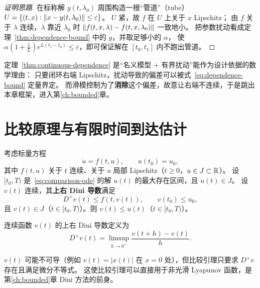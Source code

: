 \begin{proof}[证明思路]
  在标称解 $y(t,\lambda_0)$ 周围构造一根“管道”（tube）$U=\{(t,x):\left\lVert x-y(t,\lambda_0)\right\rVert\le\varepsilon\}$。
  $U$ 紧，故 $f$ 在 $U$ 上关于 $x$ Lipschitz；
  由 $f$ 关于 $\lambda$ 连续，$\lambda$ 靠近 $\lambda_0$ 时 $\left\lVert f(t,x,\lambda)-f(t,x,\lambda_0)\right\rVert$ 一致地小。
  把参数扰动看成定理~\ref{thm:dependence-bound} 中的 $g$，并取足够小的 $\alpha$，
  使 $\alpha\left(1+\frac1L\right)e^{L(t_1-t_0)}\le\varepsilon$，即可保证解在 $[t_0,t_1]$ 内不跑出管道。
\end{proof}

\begin{remark}[对滑模控制的意义]
  定理~\ref{thm:continuous-dependence} 是“名义模型 + 有界扰动”能作为设计依据的数学理由：
  只要闭环右端 Lipschitz，扰动导致的偏差可以被式~\eqref{eq:dependence-bound} 定量界定。
  而滑模控制为了\textbf{消除}这个偏差，故意让右端不连续，于是跳出本章框架，进入第\ref{ch:bounded}章。
\end{remark}

\section{比较原理与有限时间到达估计}\label{sec:comparison-lemma}

\begin{lemma}[比较引理]\label{lem:comparison}
  考虑标量方程
  \begin{equation}\label{eq:comparison-ode}
    \dot u=f(t,u),\qquad u(t_0)=u_0,
  \end{equation}
  其中 $f(t,u)$ 关于 $t$ 连续、关于 $u$ 局部 Lipschitz（$t\ge0$，$u\in J\subset\mathbb{R}$）。
  设 $[t_0,T)$ 是~\eqref{eq:comparison-ode} 的解 $u(t)$ 的最大存在区间，且 $u(t)\in J$。
  设 $v(t)$ 连续，其\textbf{上右 Dini 导数}满足
  \begin{equation}
    D^+v(t)\le f(t,v(t)),\qquad v(t_0)\le u_0,
  \end{equation}
  且 $v(t)\in J$（$t\in[t_0,T)$）。则 $v(t)\le u(t)$（$t\in[t_0,T)$）。
  \cite[Lemma 3.4]{khalilNonlinearSystems}
\end{lemma}

\begin{definition}[上右 Dini 导数]
  连续函数 $v(t)$ 的上右 Dini 导数定义为
  \begin{equation}
    D^+v(t)=\limsup_{h\to0^+}\frac{v(t+h)-v(t)}{h}.
  \end{equation}
\end{definition}

\begin{remark}
  $v(t)$ 可能不可导（例如 $v(t)=|x(t)|$ 在 $x=0$ 处），但比较引理只要求 $D^+v$ 存在且满足微分不等式。
  这使比较引理可以直接用于非光滑 Lyapunov 函数，是第\ref{ch:bounded}章 Dini 方法的前身。
\end{remark}

